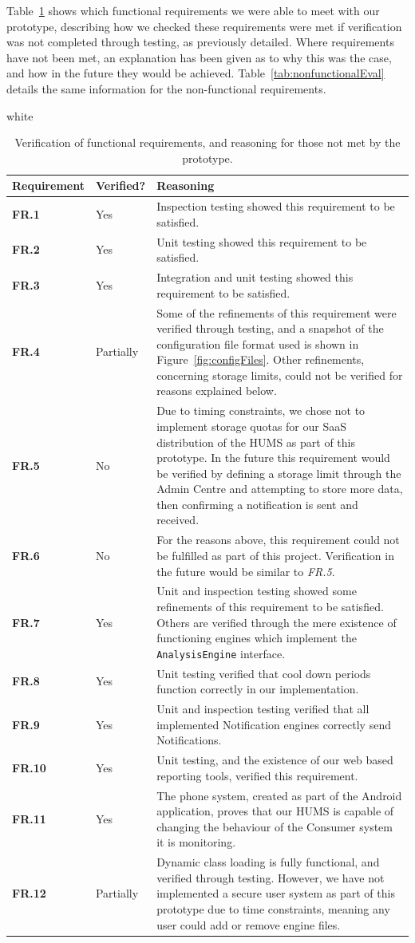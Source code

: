 \documentclass[10pt,a4paper]{article}
\newcommand{\tableformat}[4]{
\begin{table}[ht!]
\centering
  \rowcolors{2}{gray!10} {white}
\def\arraystretch{1.5}
\begin{tabularx}{\textwidth}{#1}
  \hline
  \rowcolor[gray]{0.9} #2
  \hline
\end{tabularx}
\caption{#3}
\label{#4}
\end{table}}
\newcommand{\fr}[1]{\textcolor{reqColor}{\textbf{FR.#1}}}
\begin{document}
Table~\ref{tab:functionalEval} shows which functional requirements we were able to meet with our prototype, describing how we checked these requirements were met if verification was not completed through testing, as previously detailed. Where requirements have not been met, an explanation has been given as to why this was the case, and how in the future they would be achieved. Table~\ref{tab:nonfunctionalEval} details the same information for the non-functional requirements.

\tableformat{ p{2cm}  p{2cm} X }{
Requirement & Verified? & Reasoning \\ \hline
\fr{1} & Yes & Inspection testing showed this requirement to be satisfied.\\
\fr{2} & Yes & Unit testing showed this requirement to be satisfied.\\
\fr{3} & Yes & Integration and unit testing showed this requirement to be satisfied.\\
\fr{4} & Partially & Some of the refinements of this requirement were verified through testing, and a snapshot of the configuration file format used is shown in Figure~\ref{fig:configFiles}. Other refinements, concerning storage limits, could not be verified for reasons explained below. \\
\fr{5} & No & Due to timing constraints, we chose not to implement storage quotas for our SaaS distribution of the HUMS as part of this prototype. In the future this requirement would be verified by defining a storage limit through the Admin Centre and attempting to store more data, then confirming a notification is sent and received.\\
\fr{6} & No & For the reasons above, this requirement could not be fulfilled as part of this project. Verification in the future would be similar to \emph{FR.5}.\\
\fr{7} & Yes & Unit and inspection testing showed some refinements of this requirement to be satisfied. Others are verified through the mere existence of functioning engines which implement the \texttt{AnalysisEngine} interface.\\
\fr{8} & Yes & Unit testing verified that cool down periods function correctly in our implementation. \\
\fr{9} & Yes & Unit and inspection testing verified that all implemented Notification engines correctly send Notifications.\\
\fr{10}& Yes & Unit testing, and the existence of our web based reporting tools, verified this requirement.\\
\fr{11}& Yes & The phone system, created as part of the Android application, proves that our HUMS is capable of changing the behaviour of the Consumer system it is monitoring.\\
\fr{12}& Partially & Dynamic class loading is fully functional, and verified through testing. However, we have not implemented a secure user system as part of this prototype due to time constraints, meaning any user could add or remove engine files. \\
}{Verification of functional requirements, and reasoning for those not met by the prototype.}{tab:functionalEval}
\end{document}
